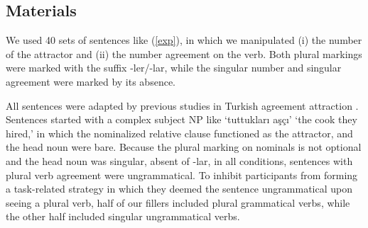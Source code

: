 \documentclass[
  authoryear,
  3p]{elsarticle}
\begin{document}
\subsection{Materials}\label{materials}

We used 40 sets of sentences like (\ref{exp}), in which we manipulated
(i) the number of the attractor and (ii) the number agreement on the
verb. Both plural markings were marked with the suffix -ler/-lar, while
the singular number and singular agreement were marked by its absence.

\begin{exe}
\ex \label{exp}
\begin{xlist}
\end{xlist}
\end{exe}

All sentences were adapted by previous studies in Turkish agreement
attraction \citep{LagoEtAl2019, TurkLogacev2024}. Sentences started with
a complex subject NP like `tuttukları aşçı' `the cook they hired,' in
which the nominalized relative clause functioned as the attractor, and
the head noun were bare. Because the plural marking on nominals is not
optional and the head noun was singular, absent of -lar, in all
conditions, sentences with plural verb agreement were ungrammatical. To
inhibit participants from forming a task-related strategy in which they
deemed the sentence ungrammatical upon seeing a plural verb, half of our
fillers included plural grammatical verbs, while the other half included
singular ungrammatical verbs.
\end{document}
